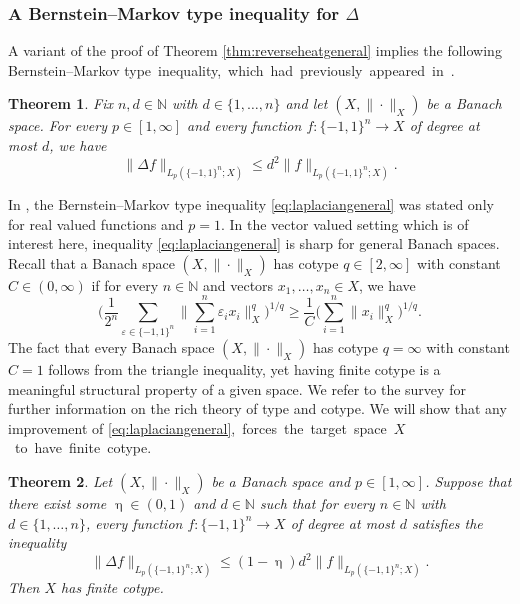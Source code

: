 \documentclass[11pt,reqno]{amsart}
\renewcommand{\leq}{\leqslant}
\renewcommand{\geq}{\geqslant}
\newcommand{\e}{\varepsilon}
\newcommand{\1}{\mathbf 1}
\newtheorem{theorem}{Theorem}
\theoremstyle{remark}
\newcommand{\N}{\mathbb N}
\renewcommand{\eta}{\upeta}
\begin{document}
\subsubsection{A Bernstein--Markov type inequality for $\Delta$} A variant of the proof of Theorem \ref{thm:reverseheatgeneral} implies the following Bernstein--Markov \mbox{type inequality, which had previously appeared in \cite{FHKL16}.}

\begin{theorem} \label{thm:laplaciangeneral}
Fix $n,d\in\N$ with $d\in\{1,\ldots,n\}$ and let $(X,\|\cdot\|_X)$ be a Banach space. For every $p\in[1,\infty]$ and every function $f:\{-1,1\}^n \to X$ of degree at most $d$, we have
\begin{equation} \label{eq:laplaciangeneral}
\| \Delta f\|_{L_p(\{-1,1\}^n;X)} \leq d^2 \|f\|_{L_p(\{-1,1\}^n;X)}.
\end{equation}
\end{theorem}

In \cite[Lemma~5.4]{FHKL16}, the Bernstein--Markov type inequality \eqref{eq:laplaciangeneral} was stated only for real valued functions and $p=1$. In the vector valued setting which is of interest here, inequality \eqref{eq:laplaciangeneral} is sharp for general Banach spaces. Recall that a Banach space $(X,\|\cdot\|_X)$ has cotype $q\in[2,\infty]$ with constant $C\in(0,\infty)$ if for every $n\in\N$ and vectors $x_1,\ldots,x_n\in X$, we have
\begin{equation}
\Big(\frac{1}{2^n} \sum_{\e\in\{-1,1\}^n} \Big\|\sum_{i=1}^n \e_i x_i\Big\|_X^q\Big)^{1/q}  \geq \frac{1}{C} \Big(\sum_{i=1}^n \|x_i\|_X^q\Big)^{1/q}.
\end{equation}
The fact that every Banach space $(X,\|\cdot\|_X)$ has cotype $q=\infty$ with constant $C=1$ follows from the triangle inequality, yet having finite cotype is a meaningful structural property of a given space. We refer to the survey \cite{Mau03} for further information on the rich theory of type and cotype. We will show that any improvement of \eqref{eq:laplaciangeneral}\mbox{, forces the target space $X$ to have finite cotype.}

\begin{theorem} \label{thm:cotype}
Let $(X,\|\cdot\|_X)$ be a Banach space and $p\in[1,\infty]$. Suppose that there exist some $\eta\in(0,1)$ and $d\in\N$ such that for every $n\in\N$ with $d\in\{1,\ldots,n\}$, every function $f:\{-1,1\}^n \to X$ of degree at most $d$ satisfies the inequality
\begin{equation} \label{eq:cotypeassumption}
\|\Delta f\|_{L_p(\{-1,1\}^n;X)} \leq (1-\eta)d^2 \|f\|_{L_p(\{-1,1\}^n;X)}.
\end{equation}
Then $X$ has finite cotype.
\end{theorem}
\end{document}
